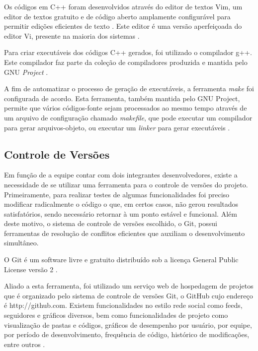 Os códigos em C++ foram desenvolvidos através do editor de textos Vim, um editor de textos gratuito e de código aberto amplamente configurável para permitir edições eficientes de texto \cite{vimabout}. Este editor é uma versão aperfeiçoada do editor Vi, presente na maioria dos sistemas .

Para criar executáveis dos códigos C++ gerados, foi utilizado o compilador g++. Este compilador faz parte da coleção de compiladores  \cite{gccabout} produzida e mantida pelo GNU \emph{Project} \cite{gnuabout}.

A fim de automatizar o processo de geração de executáveis, a ferramenta \emph{make} foi configurada de acordo. Esta ferramenta, também mantida pelo GNU Project, permite que vários códigos-fonte sejam processados ao mesmo tempo através de um arquivo de configuração chamado \emph{makefile}, que pode executar um compilador para gerar arquivos-objeto, ou executar um \emph{linker} para gerar executáveis \cite{makeabout}.
 
\subsection{Controle de Versões}

Em função de a equipe contar com dois integrantes desenvolvedores, existe a necessidade de se utilizar uma ferramenta para o controle de versões do projeto. Primeiramente, para realizar testes de algumas funcionalidades foi preciso modificar radicalmente o código o que, em certos casos, não gerou resultados satisfatórios, sendo necessário retornar à um ponto estável e funcional. Além deste motivo, o sistema de controle de versões escolhido, o Git, possui ferramentas de resolução de conflitos eficientes que auxiliam o desenvolvimento simultâneo.

O Git é um software livre e gratuito distribuído sob a licença  General Public License versão 2 \cite{git}.

Aliado a esta ferramenta, foi utilizado um serviço web de hospedagem de projetos que é organizado pelo sistema de controle de versões Git, o GitHub cujo endereço é http://github.com. Existem funcionalidades no estilo rede social como feeds, seguidores e gráficos diversos, bem como funcionalidades de projeto como visualização de pastas e códigos, gráficos de desempenho por usuário, por equipe, por período de desenvolvimento, frequência de código, histórico de modificações, entre outros \cite{githubabout}.


